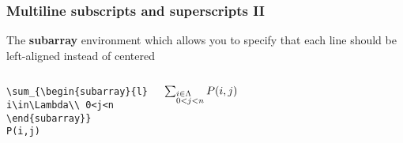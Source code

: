 \documentclass[12pt]{beamer}
\begin{document}
\begin{frame}[fragile]
\frametitle{Multiline subscripts and superscripts II}
The \textbf{subarray} environment which allows you to specify that each line should be left-aligned instead of centered
    \begin{columns}
        \begin{block}{}
        \begin{verbatim}
\sum_{\begin{subarray}{l}
i\in\Lambda\\ 0<j<n
\end{subarray}}
P(i,j)
        \end{verbatim}
        \end{block}
        \begin{block}{}
        $\sum_{\begin{subarray}{l}
        i\in\Lambda\\ 0<j<n
        \end{subarray}}
        P(i,j)$
        \end{block}
    \end{columns}
\end{frame}
\end{document}
